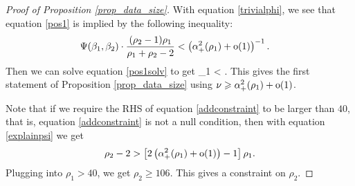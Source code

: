 \begin{proof}[Proof of Proposition \ref{prop_data_size}]
%

 With equation \eqref{trivialphi}, we see that equation \eqref{pos1} is implied by the following inequality:
\begin{align}\label{pos1solv}
 &  \Psi(\beta_1,\beta_2) \cdot \frac{(\rho_2-1) \rho_1 }{\rho_1+\rho_2-2}   < \left( \alpha_+^2(\rho_1) +  \operatorname{o}(1) \right)^{-1} .
 \end{align}
 Then we can solve equation \eqref{pos1solv} to get
 \be\label{addconstraint}\rho_1 <   .\ee
 This gives the first statement of Proposition \ref{prop_data_size} using $\nu\geqslant \alpha_+^2(\rho_1) +  \operatorname{o}(1) $. %
 
 
 Note that if we require the RHS of equation \eqref{addconstraint} to be larger than $40$, that is, equation \eqref{addconstraint} is not a null condition, then with equation \eqref{explainpsi} we get
 $$ \rho_2 - 2>\left[ 2\left( \alpha_+^2(\rho_1) +  \operatorname{o}(1) \right)  -1\right]\rho_1 .$$
Plugging into $\rho_1>40$, we get $\rho_2 \ge 106$. This gives a constraint on $\rho_2$. 
 

\vspace{5pt}


\end{proof}

